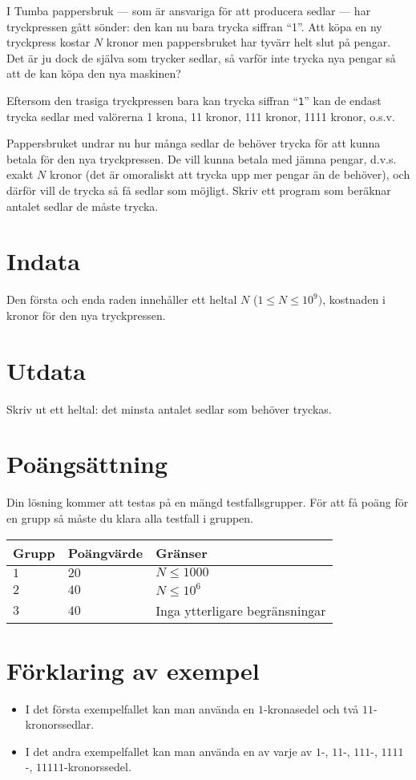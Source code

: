 I Tumba pappersbruk --- som är ansvariga för att producera sedlar --- har tryckpressen gått sönder: den kan nu bara trycka siffran ``1''.
Att köpa en ny tryckpress kostar $N$ kronor men pappersbruket har tyvärr helt slut på pengar.
Det är ju dock de själva som trycker sedlar, så varför inte trycka nya pengar så att de kan köpa den nya maskinen?

Eftersom den trasiga tryckpressen bara kan trycka siffran ``\texttt{1}'' kan de endast trycka sedlar med valörerna 1 krona, 11 kronor, 111 kronor, 1111 kronor, o.s.v.

Pappersbruket undrar nu hur många sedlar de behöver trycka för att kunna betala för den nya tryckpressen.
De vill kunna betala med jämna pengar, d.v.s. exakt $N$ kronor (det är omoraliskt att trycka upp mer pengar än de behöver), och därför vill de trycka så få sedlar som möjligt.
Skriv ett program som beräknar antalet sedlar de måste trycka.

\section*{Indata}
Den första och enda raden innehåller ett heltal $N$ ($1 \le N \le 10^9)$, kostnaden i kronor för den nya tryckpressen.

\section*{Utdata}
Skriv ut ett heltal: det minsta antalet sedlar som behöver tryckas.

\section*{Poängsättning}
Din lösning kommer att testas på en mängd testfallsgrupper.
För att få poäng för en grupp så måste du klara alla testfall i gruppen.

\noindent
\begin{tabular}{| l | l | l |}
  \hline
  Grupp & Poängvärde & Gränser \\ \hline
  $1$    & $20$        &  $ N \leq 1000 $ \\ \hline 
  $2$    & $40$        &  $ N \leq 10^6 $ \\ \hline
  $3$    & $40$        &  Inga ytterligare begränsningar \\ \hline
\end{tabular}

\section*{Förklaring av exempel}
\begin{itemize}
  \item I det första exempelfallet kan man använda en $1$-kronasedel och två $11$-kronorssedlar.
  \item I det andra exempelfallet kan man använda en av varje av $1$-, $11$-, $111$-, $1111$-, $11111$-kronorssedel.
\end{itemize}
